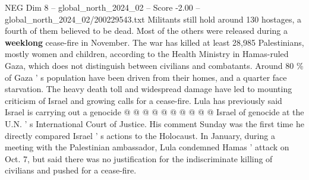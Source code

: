 \begin{textsample}{NEG Dim 8 – global\_north\_2024\_02 – Score -2.00 – global\_north\_2024\_02/200229543.txt}
Militants still hold around 130 hostages, a fourth of them believed to be dead.
Most of the others were released during a \textbf{weeklong} cease-fire in November.
The war has killed at least 28,985 Palestinians, mostly women and children, according to the Health Ministry in Hamas-ruled Gaza, which does not distinguish between civilians and combatants.
Around 80 \% of Gaza ' s population have been driven from their homes, and a quarter face starvation.
The heavy death toll and widespread damage have led to mounting criticism of Israel and growing calls for a cease-fire.
Lula has previously said Israel is carrying out a genocide @ @ @ @ @ @ @ @ @ @ Israel of genocide at the U.N. ' s International Court of Justice.
His comment Sunday was the first time he directly compared Israel ' s actions to the Holocaust.
In January, during a meeting with the Palestinian ambassador, Lula condemned Hamas ' attack on Oct. 7, but said there was no justification for the indiscriminate killing of civilians and pushed for a cease-fire.

\end{textsample}
